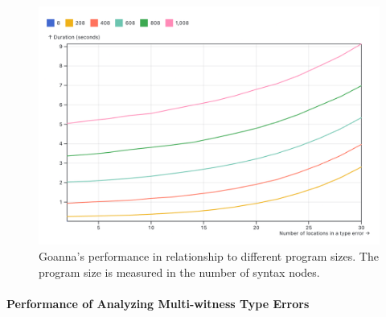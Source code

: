 \documentclass[pdflatex,sn-mathphys-num]{sn-jnl}%
\begin{document}
 \begin{figure}[ht]
        \centering
        \includegraphics[width=0.8\linewidth]{images/multi-step.png}
        \caption{Goanna's performance in relationship to different program sizes. The program size is measured in the number of syntax nodes.}
        \label{fig:multi-step-time}
    \end{figure}



    \paragraph{\textbf{Performance of Analyzing Multi-witness Type Errors}}
\end{document}

